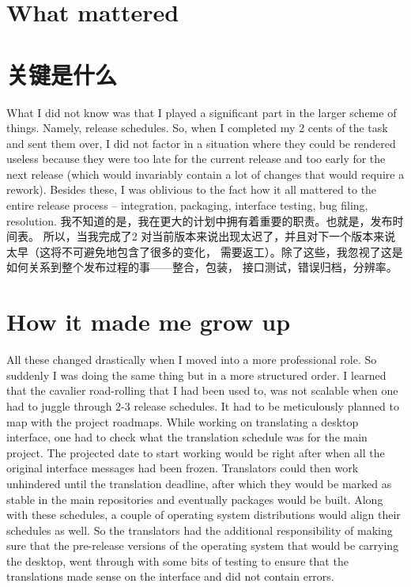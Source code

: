 \section*{What mattered}
\section*{关键是什么}

What I did not know was that I played a significant part in the larger scheme of
things. Namely, release schedules. So, when I completed my 2 cents of the task
and sent them over, I did not factor in a situation where they could be rendered
useless because they were too late for the current release and too early for the
next release (which would invariably contain a lot of changes that would require
a rework). Besides these, I was oblivious to the fact how it all mattered to the
entire release process -- integration, packaging, interface testing, bug filing,
resolution.
我不知道的是，我在更大的计划中拥有着重要的职责。也就是，发布时间表。
所以，当我完成了2%
对当前版本来说出现太迟了，并且对下一个版本来说太早（这将不可避免地包含了很多的变化，
需要返工）。除了这些，我忽视了这是如何关系到整个发布过程的事——整合，包装，
接口测试，错误归档，分辨率。

\section*{How it made me grow up}

All these changed drastically when I moved into a more professional role. So
suddenly I was doing the same thing but in a more structured order. I learned
that the cavalier road-rolling that I had been used to, was not scalable when
one had to juggle through 2-3 release schedules. It had to be meticulously
planned to map with the project roadmaps. While working on translating a desktop
interface, one had to check what the translation schedule was for the main
project. The projected date to start working would be right after when all the
original interface messages had been frozen. Translators could then work
unhindered until the translation deadline, after which they would be marked as
stable in the main repositories and eventually packages would be built. Along
with these schedules, a couple of operating system
distributions would align their schedules as well. So the translators had the
additional responsibility of making sure that the pre-release versions of the
operating system that would be carrying the desktop, went through with some bits
of testing to ensure that the translations made sense on the interface and did
not contain errors.

